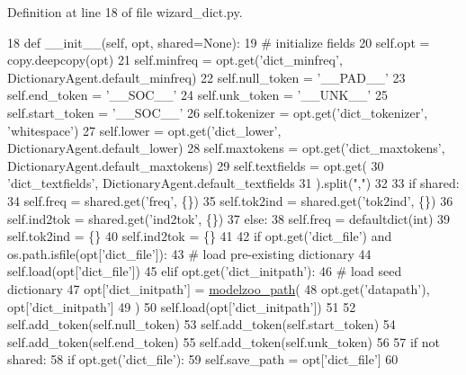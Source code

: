 Definition at line 18 of file wizard\+\_\+dict.\+py.


\begin{DoxyCode}
18     \textcolor{keyword}{def }\_\_init\_\_(self, opt, shared=None):
19         \textcolor{comment}{# initialize fields}
20         self.opt = copy.deepcopy(opt)
21         self.minfreq = opt.get(\textcolor{stringliteral}{'dict\_minfreq'}, DictionaryAgent.default\_minfreq)
22         self.null\_token = \textcolor{stringliteral}{'\_\_PAD\_\_'}
23         self.end\_token = \textcolor{stringliteral}{'\_\_SOC\_\_'}
24         self.unk\_token = \textcolor{stringliteral}{'\_\_UNK\_\_'}
25         self.start\_token = \textcolor{stringliteral}{'\_\_SOC\_\_'}
26         self.tokenizer = opt.get(\textcolor{stringliteral}{'dict\_tokenizer'}, \textcolor{stringliteral}{'whitespace'})
27         self.lower = opt.get(\textcolor{stringliteral}{'dict\_lower'}, DictionaryAgent.default\_lower)
28         self.maxtokens = opt.get(\textcolor{stringliteral}{'dict\_maxtokens'}, DictionaryAgent.default\_maxtokens)
29         self.textfields = opt.get(
30             \textcolor{stringliteral}{'dict\_textfields'}, DictionaryAgent.default\_textfields
31         ).split(\textcolor{stringliteral}{","})
32 
33         \textcolor{keywordflow}{if} shared:
34             self.freq = shared.get(\textcolor{stringliteral}{'freq'}, \{\})
35             self.tok2ind = shared.get(\textcolor{stringliteral}{'tok2ind'}, \{\})
36             self.ind2tok = shared.get(\textcolor{stringliteral}{'ind2tok'}, \{\})
37         \textcolor{keywordflow}{else}:
38             self.freq = defaultdict(int)
39             self.tok2ind = \{\}
40             self.ind2tok = \{\}
41 
42             \textcolor{keywordflow}{if} opt.get(\textcolor{stringliteral}{'dict\_file'}) \textcolor{keywordflow}{and} os.path.isfile(opt[\textcolor{stringliteral}{'dict\_file'}]):
43                 \textcolor{comment}{# load pre-existing dictionary}
44                 self.load(opt[\textcolor{stringliteral}{'dict\_file'}])
45             \textcolor{keywordflow}{elif} opt.get(\textcolor{stringliteral}{'dict\_initpath'}):
46                 \textcolor{comment}{# load seed dictionary}
47                 opt[\textcolor{stringliteral}{'dict\_initpath'}] = \hyperlink{namespaceparlai_1_1agents_1_1legacy__agents_1_1seq2seq_1_1utils__v0_a5fbd3301b67f00d6d146fb01c7cd7626}{modelzoo\_path}(
48                     opt.get(\textcolor{stringliteral}{'datapath'}), opt[\textcolor{stringliteral}{'dict\_initpath'}]
49                 )
50                 self.load(opt[\textcolor{stringliteral}{'dict\_initpath'}])
51 
52             self.add\_token(self.null\_token)
53             self.add\_token(self.start\_token)
54             self.add\_token(self.end\_token)
55             self.add\_token(self.unk\_token)
56 
57         \textcolor{keywordflow}{if} \textcolor{keywordflow}{not} shared:
58             \textcolor{keywordflow}{if} opt.get(\textcolor{stringliteral}{'dict\_file'}):
59                 self.save\_path = opt[\textcolor{stringliteral}{'dict\_file'}]
60 
\end{DoxyCode}


